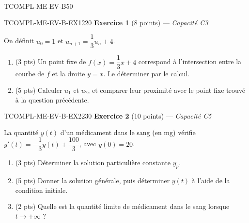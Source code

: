 

\begin{evaluation}{TCOMPL-ME-EV-B}{50}

\begin{exercice}{TCOMPL-ME-EV-B-EX1}{2}{20}
\textbf{Exercice 1} (8 points) --- \textit{Capacité C3}

\medskip

On définit $u_0=1$ et $u_{n+1} = \dfrac{1}{3}u_n + 4$.
\begin{enumerate}
  \item (3 pts) Un point fixe de $f(x)=\dfrac{1}{3}x+4$ correspond à l'intersection entre la courbe de $f$ et la droite $y=x$. Le déterminer par le calcul.
  \item (5 pts) Calculer $u_1$ et $u_2$, et comparer leur proximité avec le point fixe trouvé à la question précédente.
\end{enumerate}
\end{exercice}

\begin{exercice}{TCOMPL-ME-EV-B-EX2}{2}{30}
\textbf{Exercice 2} (10 points) --- \textit{Capacité C5}

\medskip

La quantité $y(t)$ d'un médicament dans le sang (en mg) vérifie $y'(t) = -\dfrac{1}{3}y(t) + \dfrac{100}{3}$, avec $y(0)=20$.
\begin{enumerate}
  \item (3 pts) Déterminer la solution particulière constante $y_p$.
  \item (5 pts) Donner la solution générale, puis déterminer $y(t)$ à l'aide de la condition initiale.
  \item (2 pts) Quelle est la quantité limite de médicament dans le sang lorsque $t\to+\infty$ ?
\end{enumerate}
\end{exercice}


\end{evaluation}
